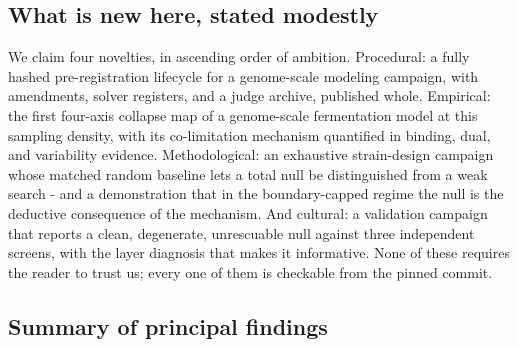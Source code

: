 \documentclass[12pt]{article}
\begin{document}
\subsection{What is new here, stated modestly}

We claim four novelties, in ascending order of ambition. Procedural:
a fully hashed pre-registration lifecycle for a genome-scale modeling
campaign, with amendments, solver registers, and a judge archive,
published whole. Empirical: the first four-axis collapse map of a
genome-scale fermentation model at this sampling density, with its
co-limitation mechanism quantified in binding, dual, and variability
evidence. Methodological: an exhaustive strain-design campaign whose
matched random baseline lets a total null be distinguished from a
weak search - and a demonstration that in the boundary-capped regime
the null is the deductive consequence of the mechanism. And cultural:
a validation campaign that reports a clean, degenerate, unrescuable
null against three independent screens, with the layer diagnosis
that makes it informative. None of these requires the reader to trust
us; every one of them is checkable from the pinned commit.

\subsection{Summary of principal findings}
\end{document}
